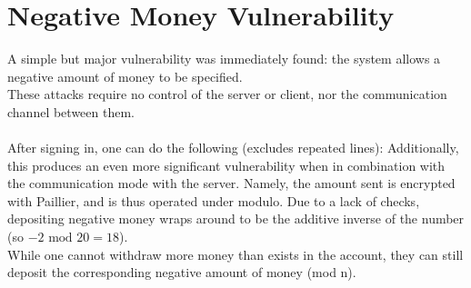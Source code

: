 \documentclass{article}
\begin{document}
\section{Negative Money Vulnerability}
A simple but major vulnerability was immediately found: the system allows a negative amount of money to be specified. \\
These attacks require no control of the server or client, nor the communication channel between them. \\
\\
After signing in, one can do the following (excludes repeated lines):
Additionally, this produces an even more significant vulnerability when in combination with the communication mode with the server. Namely, the amount sent is encrypted with Paillier, and is thus operated under modulo. Due to a lack of checks, depositing negative money wraps around to be the additive inverse of the number (so $-2\text{ mod } 20 = 18$). \\
While one cannot withdraw more money than exists in the account, they can still deposit the corresponding negative amount of money (mod n).
\end{document}
